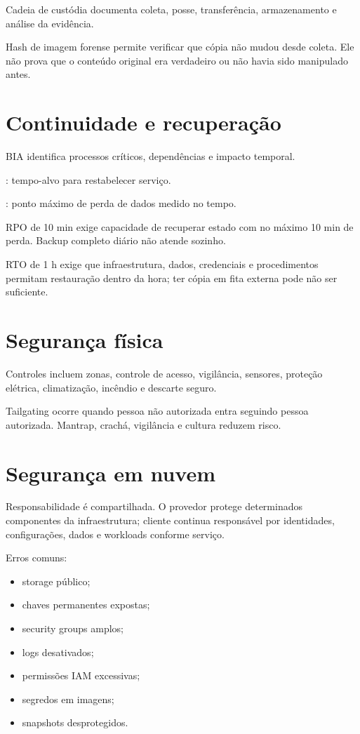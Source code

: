Cadeia de custódia documenta coleta, posse, transferência, armazenamento e análise da evidência.

Hash de imagem forense permite verificar que cópia não mudou desde coleta. Ele não prova que o conteúdo original era verdadeiro ou não havia sido manipulado antes.

\section{Continuidade e recuperação}

BIA identifica processos críticos, dependências e impacto temporal.

: tempo-alvo para restabelecer serviço.

: ponto máximo de perda de dados medido no tempo.

\begin{exemplo}
RPO de 10 min exige capacidade de recuperar estado com no máximo 10 min de perda. Backup completo diário não atende sozinho.

RTO de 1 h exige que infraestrutura, dados, credenciais e procedimentos permitam restauração dentro da hora; ter cópia em fita externa pode não ser suficiente.
\end{exemplo}

\section{Segurança física}

Controles incluem zonas, controle de acesso, vigilância, sensores, proteção elétrica, climatização, incêndio e descarte seguro.

Tailgating ocorre quando pessoa não autorizada entra seguindo pessoa autorizada. Mantrap, crachá, vigilância e cultura reduzem risco.

\section{Segurança em nuvem}

Responsabilidade é compartilhada. O provedor protege determinados componentes da infraestrutura; cliente continua responsável por identidades, configurações, dados e workloads conforme serviço.

Erros comuns:
\begin{itemize}
\item storage público;
\item chaves permanentes expostas;
\item security groups amplos;
\item logs desativados;
\item permissões IAM excessivas;
\item segredos em imagens;
\item snapshots desprotegidos.
\end{itemize}

